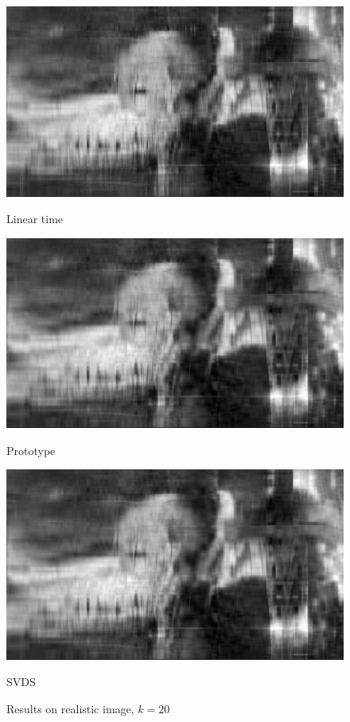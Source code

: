 \documentclass{article}
\begin{document}
\begin{figure}[p]
	\begin{minipage}{0.33\linewidth}
		\centering
		\includegraphics[width=1\linewidth]{./fig/image_rec31.jpeg}
		\caption{Linear time}
	\end{minipage}
	\begin{minipage}{0.33\linewidth}
		\centering
		\includegraphics[width=1\linewidth]{./fig/image_rec32.jpeg}
		\caption{Prototype}
	\end{minipage}
    \begin{minipage}{0.33\linewidth}
		\centering
		\includegraphics[width=1\linewidth]{./fig/image_rec33.jpeg}
		\caption{SVDS }
	\end{minipage}
	\caption*{Results on realistic image, $k=20$}
\end{figure} 
\end{document}
